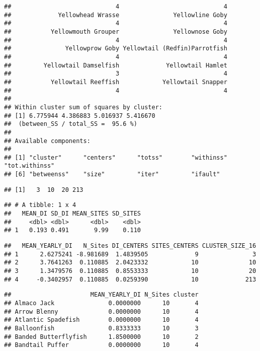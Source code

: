 \documentclass[
]{article}
\begin{document}
\begin{verbatim}
##                             4                             4 
##             Yellowhead Wrasse               Yellowline Goby 
##                             4                             4 
##           Yellowmouth Grouper               Yellownose Goby 
##                             4                             4 
##               Yellowprow Goby Yellowtail (Redfin)Parrotfish 
##                             4                             4 
##         Yellowtail Damselfish             Yellowtail Hamlet 
##                             3                             4 
##           Yellowtail Reeffish            Yellowtail Snapper 
##                             4                             4 
## 
## Within cluster sum of squares by cluster:
## [1] 6.775944 4.386883 5.016937 5.416670
##  (between_SS / total_SS =  95.6 %)
## 
## Available components:
## 
## [1] "cluster"      "centers"      "totss"        "withinss"     "tot.withinss"
## [6] "betweenss"    "size"         "iter"         "ifault"
\end{verbatim}

\begin{verbatim}
## [1]   3  10  20 213
\end{verbatim}

\begin{verbatim}
## # A tibble: 1 x 4
##   MEAN_DI SD_DI MEAN_SITES SD_SITES
##     <dbl> <dbl>      <dbl>    <dbl>
## 1   0.193 0.491       9.99    0.110
\end{verbatim}

\begin{verbatim}
##   MEAN_YEARLY_DI   N_Sites DI_CENTERS SITES_CENTERS CLUSTER_SIZE_16
## 1      2.6275241 -8.981689  1.4839505             9               3
## 2      3.7641263  0.110885  2.0423332            10              10
## 3      1.3479576  0.110885  0.8553333            10              20
## 4     -0.3402957  0.110885  0.0259390            10             213
\end{verbatim}

\begin{verbatim}
##                      MEAN_YEARLY_DI N_Sites cluster
## Almaco Jack               0.0000000      10       4
## Arrow Blenny              0.0000000      10       4
## Atlantic Spadefish        0.0000000      10       4
## Balloonfish               0.8333333      10       3
## Banded Butterflyfish      1.8500000      10       2
## Bandtail Puffer           0.0000000      10       4
\end{verbatim}
\end{document}

